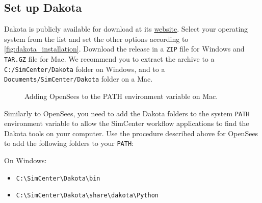 \subsection{Set up Dakota}

Dakota is publicly available for download at its \href{http://dakota.sandia.gov/download.html}{website}. Select your operating system from the list and set the other options according to \autoref{fig:dakota_installation}. Download the release in a \texttt{ZIP} file for Windows and \texttt{TAR.GZ} file for Mac. We recommend you to extract the archive to a \texttt{C:/SimCenter/Dakota} folder on Windows, and to a \texttt{Documents/SimCenter/Dakota} folder on a Mac.

\begin{figure}[!htbp]
  \caption{Adding OpenSees to the PATH environment variable on Mac.}
  \label{fig:dakota_installation}
\end{figure}

Similarly to OpenSees, you need to add the Dakota folders to the system \texttt{PATH} environment variable to allow the SimCenter workflow applications to find the Dakota tools on your computer. Use the procedure described above for OpenSees to add the following folders to your \texttt{PATH}:

On Windows:
\begin{itemize}
    \item \texttt{C:\textbackslash SimCenter\textbackslash Dakota\textbackslash bin}
    \item \texttt{C:\textbackslash SimCenter\textbackslash Dakota\textbackslash share\textbackslash dakota\textbackslash Python}
\end{itemize}

